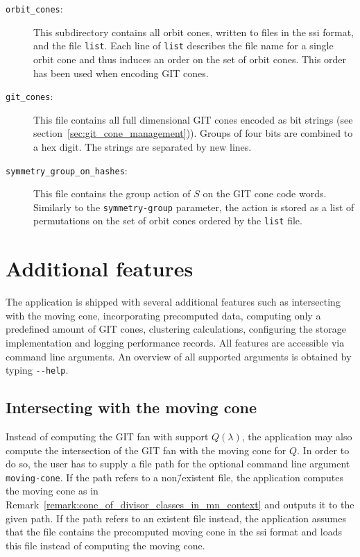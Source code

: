 \begin{description}
	\item[\texttt{orbit\_cones}:] This subdirectory contains all orbit cones, written to files in the \ac{ssi} format, and the file \texttt{list}. Each line of \texttt{list} describes the file name for a single orbit cone and thus induces an order on the set of orbit cones. This order has been used when encoding GIT cones.
	\item[\texttt{git\_cones}:] This file contains all full dimensional GIT cones encoded as bit strings (see section~\ref{sec:git_cone_management})). Groups of four bits are combined to a hex digit. The strings are separated by new lines.
	\item[\texttt{symmetry\_group\_on\_hashes}:] This file contains the group action of $S$ on the GIT cone code words. Similarly to the \texttt{symmetry-group} parameter, the action is stored as a list of permutations on the set of orbit cones ordered by the \texttt{list} file.
\end{description}

\section{Additional features}
\label{sec:additional_features}

The application is shipped with several additional features such as intersecting with the moving cone, incorporating precomputed data, computing only a predefined amount of GIT cones, clustering calculations, configuring the storage implementation and logging performance records. All features are accessible via command line arguments. An overview of all supported arguments is obtained by typing \texttt{-{}-help}.

\subsection*{Intersecting with the moving cone}

Instead of computing the GIT fan with support $Q(\lambda)$, the application may also compute the intersection of the GIT fan with the moving cone for $Q$. In order to do so, the user has to supply a file path for the optional command line argument \texttt{moving-cone}. If the path refers to a non\=/existent file, the application computes the moving cone as in Remark~\ref{remark:cone_of_divisor_classes_in_mn_context} and outputs it to the given path. If the path refers to an existent file instead, the application assumes that the file contains the precomputed moving cone in the \ac{ssi} format and loads this file instead of computing the moving cone.

